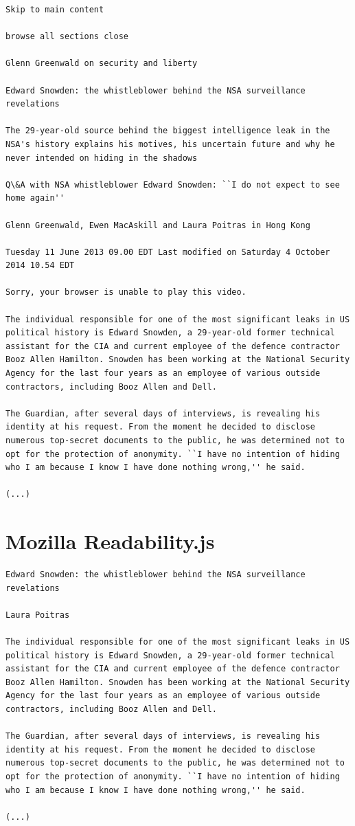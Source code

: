 \documentclass[a4paper,12pt,titlepage=false]{scrreprt}
\begin{document}
\begin{lstlisting}[breaklines=true]
Skip to main content

browse all sections close

Glenn Greenwald on security and liberty

Edward Snowden: the whistleblower behind the NSA surveillance revelations

The 29-year-old source behind the biggest intelligence leak in the NSA's history explains his motives, his uncertain future and why he never intended on hiding in the shadows

Q\&A with NSA whistleblower Edward Snowden: ``I do not expect to see home again''

Glenn Greenwald, Ewen MacAskill and Laura Poitras in Hong Kong

Tuesday 11 June 2013 09.00 EDT Last modified on Saturday 4 October 2014 10.54 EDT

Sorry, your browser is unable to play this video.

The individual responsible for one of the most significant leaks in US political history is Edward Snowden, a 29-year-old former technical assistant for the CIA and current employee of the defence contractor Booz Allen Hamilton. Snowden has been working at the National Security Agency for the last four years as an employee of various outside contractors, including Booz Allen and Dell.

The Guardian, after several days of interviews, is revealing his identity at his request. From the moment he decided to disclose numerous top-secret documents to the public, he was determined not to opt for the protection of anonymity. ``I have no intention of hiding who I am because I know I have done nothing wrong,'' he said.

(...)
\end{lstlisting}

\section{Mozilla Readability.js}

\begin{lstlisting}[breaklines=true]
Edward Snowden: the whistleblower behind the NSA surveillance revelations

Laura Poitras

The individual responsible for one of the most significant leaks in US political history is Edward Snowden, a 29-year-old former technical assistant for the CIA and current employee of the defence contractor Booz Allen Hamilton. Snowden has been working at the National Security Agency for the last four years as an employee of various outside contractors, including Booz Allen and Dell.

The Guardian, after several days of interviews, is revealing his identity at his request. From the moment he decided to disclose numerous top-secret documents to the public, he was determined not to opt for the protection of anonymity. ``I have no intention of hiding who I am because I know I have done nothing wrong,'' he said.

(...)
\end{lstlisting}
\end{document}
